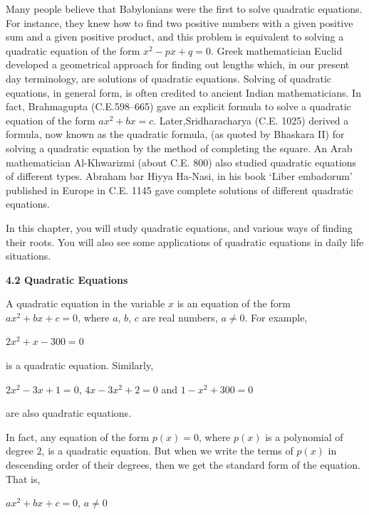 \documentclass[11pt]{article}
\begin{document}
Many people believe that Babylonians were the first to solve quadratic
equations. For instance, they knew how to find two positive numbers with a
given positive sum and a given positive product, and this problem is equivalent
to solving a quadratic equation of the form $x^2 - px + q = 0$. Greek
mathematician Euclid developed a geometrical approach for finding out lengths
which, in our present day terminology, are solutions of quadratic equations.
Solving of quadratic equations, in general form, is often credited to ancient
Indian mathematicians. In fact, Brahmagupta (C.E.598–665) gave an explicit
formula to solve a quadratic equation of the form $ax^2 + bx = c$. Later,Sridharacharya (C.E. 1025) derived a formula, now known as the quadratic formula,
(as quoted by Bhaskara II) for solving a quadratic equation by the method of
completing the square. An Arab mathematician Al-Khwarizmi (about C.E. 800) also
studied quadratic equations of different types. Abraham bar Hiyya Ha-Nasi, in his
book `Liber embadorum' published in Europe in C.E. 1145 gave complete solutions of
different quadratic equations.

\medskip

In this chapter, you will study quadratic equations, and various ways of finding
their roots. You will also see some applications of quadratic equations in daily life
situations.

\noindent\textcolor{chapterblue}{\large\textbf{4.2 Quadratic Equations}}

A quadratic equation in the variable $x$ is an equation of the form
$ax^2 + bx + c = 0$, where $a$, $b$, $c$ are real numbers, $a \neq 0$.
For example,

\begin{center}
$2x^2 + x - 300 = 0$
\end{center}

is a quadratic equation. Similarly,

\begin{center}
$2x^2 - 3x + 1 = 0$, \quad $4x - 3x^2 + 2 = 0$ \quad and \quad $1 - x^2 + 300 = 0$
\end{center}

are also quadratic equations.

In fact, any equation of the form $p(x) = 0$, where $p(x)$ is a polynomial
of degree $2$, is a quadratic equation. But when we write the terms of $p(x)$
in descending order of their degrees, then we get the standard form of the
equation. That is,

\begin{center}
$ax^2 + bx + c = 0$, \quad $a \neq 0$
\end{center}
\end{document}
